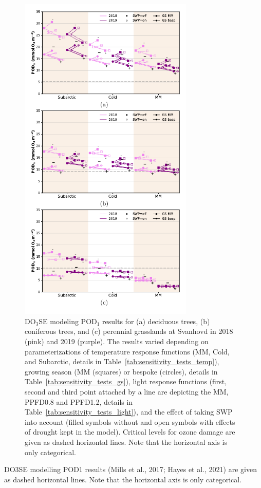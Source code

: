 \documentclass[bg, manuscript]{copernicus}
\begin{document}
\begin{figure}[t]
  \includegraphics[width=8.3cm]{fig11}
  \caption{$\mathrm{DO_3SE}$ modeling $\mathrm{POD_1}$ results for (a) deciduous trees, (b) coniferous trees, and (c) perennial grasslands at Svanhovd in 2018 (pink) and 2019 (purple). The results varied depending on parameterizations of temperature response functions (MM, Cold, and Subarctic, details in Table~\ref{tab:sensitivity_tests_temp}), growing season (MM (squares) or bespoke (circles), details in Table~\ref{tab:sensitivity_tests_gs}), light response functions (first, second and third point attached by a line are depicting the MM, PPFD0.8 and PPFD1.2, details in Table~\ref{tab:sensitivity_tests_light}), and the effect of taking SWP into account (filled symbols without and open symbols with effects of drought kept in the model). Critical levels for ozone damage \citet{ICP:MappingManual2017,ESPR:Hayes2021} are given as dashed horizontal lines. Note that the horizontal axis is only categorical.}
  \label{fig:pody_rel}
\end{figure}

DO3SE modelling POD1 results (Mills et al., 2017; Hayes et al., 2021) are given as dashed horizontal lines. Note that the horizontal axis is only categorical.
\end{document}
